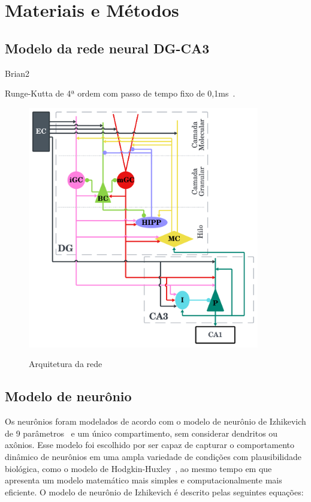 \chapter{Materiais e Métodos}

\section{Modelo da rede neural DG-CA3}


Brian2~\cite{stimbergBrian2019a}

Runge-Kutta de 4ª ordem com passo de tempo fixo de 0,1ms~\cite{butcherHistory1996}.

\begin{figure}
    \centering
    \caption{Arquitetura da rede}
    \includegraphics[width=0.9\textwidth]{figuras/arquitetura-rede.png}
    \label{fig:arquitetura-rede}
\end{figure}


\section{Modelo de neurônio}

Os neurônios foram modelados de acordo com o modelo de neurônio de Izhikevich de 9
parâmetros~\cite[cap.~8]{izhikevichDynamical2006} e um único compartimento, sem considerar dendritos ou axônios. Esse modelo foi
escolhido por ser capaz de capturar o comportamento dinâmico de neurônios em uma ampla variedade de condições com plausibilidade
biológica, como o modelo de Hodgkin-Huxley~\cite{hodgkinQuantitative1952b}, ao mesmo tempo em que apresenta um modelo matemático
mais simples e computacionalmente mais eficiente. O modelo de neurônio de Izhikevich é descrito pelas seguintes equações:

